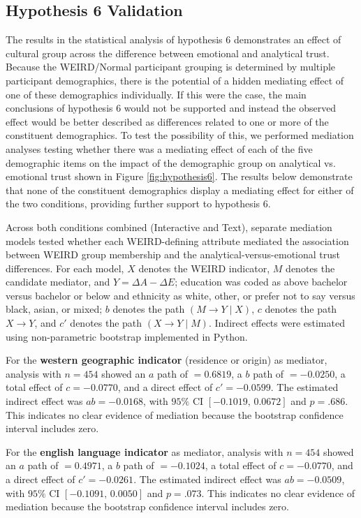 \subsection{Hypothesis 6 Validation}
The results in the statistical analysis of hypothesis 6 demonstrates an effect of cultural group across the difference between emotional and analytical trust. Because the WEIRD/Normal participant grouping is determined by multiple participant demographics, there is the potential of a hidden mediating effect of one of these demographics individually. If this were the case, the main conclusions of hypothesis 6 would not be supported and instead the observed effect would be better described as differences related to one or more of the constituent demographics. To test the possibility of this, we performed mediation analyses testing whether there was a mediating effect of each of the five demographic items on the impact of the demographic group on analytical vs. emotional trust shown in Figure \ref{fig:hypothesis6}. The results below demonstrate that none of the constituent demographics display a mediating effect for either of the two conditions, providing further support to hypothesis 6. 

Across both conditions combined (Interactive and Text), separate mediation models tested whether each WEIRD-defining attribute mediated the association between WEIRD group membership and the analytical-versus-emotional trust differences. For each model, $X$ denotes the WEIRD indicator, $M$ denotes the candidate mediator, and $Y=\Delta A-\Delta E$; education was coded as above bachelor versus bachelor or below and ethnicity as white, other, or prefer not to say versus black, asian, or mixed; $b$ denotes the path $(M \to Y\mid X)$, $c$ denotes the path $X\rightarrow Y$, and $c'$ denotes the path $(X \to Y\mid M)$. Indirect effects were estimated using non-parametric bootstrap implemented in Python. 

For the \textbf{western geographic indicator} (residence or origin) as mediator, analysis with $n=454$ showed an $a$ path of $=0.6819$, a $b$ path of $=-0.0250$, a total effect of $c=-0.0770$, and a direct effect of $c'=-0.0599$. The estimated indirect effect was $ab=-0.0168$, with $95\%$ CI $[-0.1019,\,0.0672]$ and $p=.686$. This indicates no clear evidence of mediation because the bootstrap confidence interval includes zero. 

For the \textbf{english language indicator} as mediator, analysis with $n=454$ showed an $a$ path of $=0.4971$, a $b$ path of $=-0.1024$, a total effect of $c=-0.0770$, and a direct effect of $c'=-0.0261$. The estimated indirect effect was $ab=-0.0509$, with $95\%$ CI $[-0.1091,\,0.0050]$ and $p=.073$. This indicates no clear evidence of mediation because the bootstrap confidence interval includes zero. 

